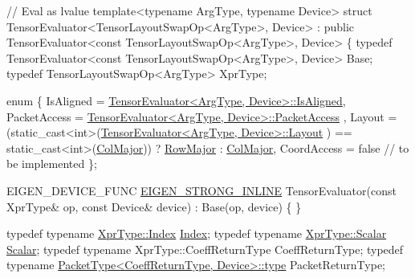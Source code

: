 \begin{DoxyCodeInclude}
\textcolor{comment}{// Eval as lvalue}
\textcolor{keyword}{template}<\textcolor{keyword}{typename} ArgType, \textcolor{keyword}{typename} Device>
  \textcolor{keyword}{struct }TensorEvaluator<TensorLayoutSwapOp<ArgType>, Device>
  : \textcolor{keyword}{public} TensorEvaluator<const TensorLayoutSwapOp<ArgType>, Device>
\{
  \textcolor{keyword}{typedef} TensorEvaluator<const TensorLayoutSwapOp<ArgType>, Device> Base;
  \textcolor{keyword}{typedef} TensorLayoutSwapOp<ArgType> XprType;

  \textcolor{keyword}{enum} \{
    IsAligned = \hyperlink{struct_eigen_1_1_tensor_evaluator_a89a733eacb0dd8a051fb66c5ce66d2f0a30fab453af3547d159853340be439a38}{TensorEvaluator<ArgType, Device>::IsAligned},
    PacketAccess = \hyperlink{struct_eigen_1_1_tensor_evaluator_a89a733eacb0dd8a051fb66c5ce66d2f0af2762e97058bc608b68a22f4b1b04e93}{TensorEvaluator<ArgType, Device>::PacketAccess}
      ,
    Layout = (\textcolor{keyword}{static\_cast<}\textcolor{keywordtype}{int}\textcolor{keyword}{>}(\hyperlink{struct_eigen_1_1_tensor_evaluator_a89a733eacb0dd8a051fb66c5ce66d2f0aad2f498adfc79da8b4728669ac46f653}{TensorEvaluator<ArgType, Device>::Layout}
      ) == static\_cast<int>(\hyperlink{group__enums_ggaacded1a18ae58b0f554751f6cdf9eb13a0cbd4bdd0abcfc0224c5fcb5e4f6669a}{ColMajor})) ? \hyperlink{group__enums_ggaacded1a18ae58b0f554751f6cdf9eb13acfcde9cd8677c5f7caf6bd603666aae3}{RowMajor} : \hyperlink{group__enums_ggaacded1a18ae58b0f554751f6cdf9eb13a0cbd4bdd0abcfc0224c5fcb5e4f6669a}{ColMajor},
    CoordAccess = \textcolor{keyword}{false}  \textcolor{comment}{// to be implemented}
  \};

  EIGEN\_DEVICE\_FUNC \hyperlink{eigen_2_eigen_2src_2_core_2util_2_macros_8h_af2b60117c00a6e75812de43bfe7db3b1}{EIGEN\_STRONG\_INLINE} TensorEvaluator(\textcolor{keyword}{const} XprType& op, \textcolor{keyword}{const} Device&
       device)
    : Base(op, device)
  \{ \}

  \textcolor{keyword}{typedef} \textcolor{keyword}{typename} \hyperlink{namespace_eigen_a62e77e0933482dafde8fe197d9a2cfde}{XprType::Index} \hyperlink{namespace_eigen_a62e77e0933482dafde8fe197d9a2cfde}{Index};
  \textcolor{keyword}{typedef} \textcolor{keyword}{typename} \hyperlink{eigen_2bench_2bench__gemm_8cpp_a052eb942d12b6404aade6fae4b075fb9}{XprType::Scalar} \hyperlink{eigen_2bench_2bench__gemm_8cpp_a052eb942d12b6404aade6fae4b075fb9}{Scalar};
  \textcolor{keyword}{typedef} \textcolor{keyword}{typename} XprType::CoeffReturnType CoeffReturnType;
  \textcolor{keyword}{typedef} \textcolor{keyword}{typename} \hyperlink{struct_eigen_1_1_packet_type_a3408a66e0894db9cb51e39dbf4fe9f0f}{PacketType<CoeffReturnType, Device>::type} 
      PacketReturnType;


\end{DoxyCodeInclude}
